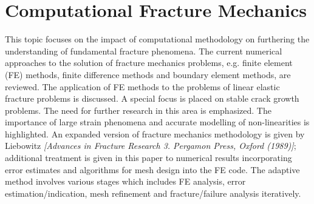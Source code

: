 \documentclass[12pt]{article}
\begin{document}
\section{Computational Fracture Mechanics}
This topic focuses on the impact of computational methodology on furthering the understanding of fundamental fracture phenomena. The current numerical approaches to the solution of fracture
mechanics problems, e.g. finite element (FE) methods, finite difference methods and boundary element
methods, are reviewed. The application of FE methods to the problems of linear elastic fracture problems
is discussed. A special focus is placed on stable crack growth problems. The need for further research in this
area is emphasized. The importance of large strain phenomena and accurate modelling of non-linearities
is highlighted. An expanded version of fracture mechanics methodology is given by Liebowitz \textit{[Advances  in Fracture Research 3. Pergamon Press, Oxford (1989)]}; additional treatment is given in this paper to
numerical results incorporating error estimates and algorithms for mesh design into the FE code. The
adaptive method involves various stages which includes FE analysis, error estimation/indication, mesh
refinement and fracture/failure analysis iteratively.

\end{document}
